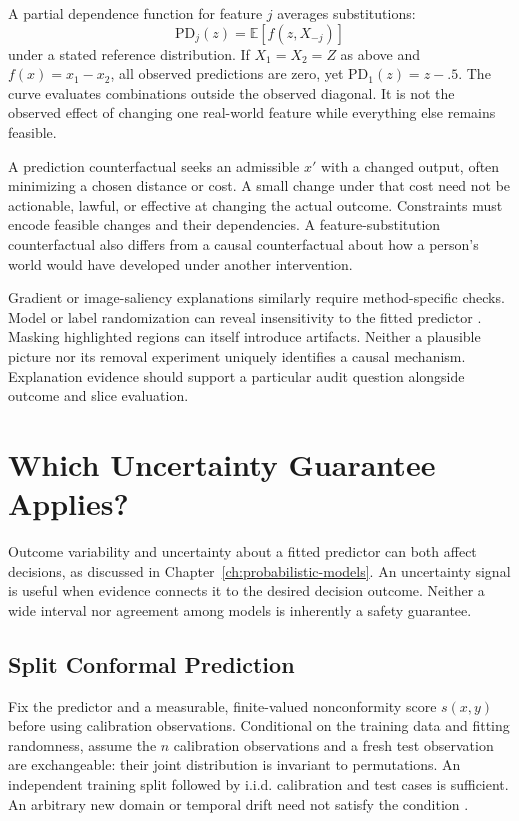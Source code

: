 A partial dependence function for feature $j$ averages substitutions:
\[
\mathrm{PD}_j(z)=\mathbb E[f(z,X_{-j})]
\]
under a stated reference distribution. If $X_1=X_2=Z$ as above and $f(x)=x_1-x_2$, all observed predictions are zero, yet $\mathrm{PD}_1(z)=z-.5$. The curve evaluates combinations outside the observed diagonal. It is not the observed effect of changing one real-world feature while everything else remains feasible.

A prediction counterfactual seeks an admissible $x'$ with a changed output, often minimizing a chosen distance or cost. A small change under that cost need not be actionable, lawful, or effective at changing the actual outcome. Constraints must encode feasible changes and their dependencies. A feature-substitution counterfactual also differs from a causal counterfactual about how a person's world would have developed under another intervention.

Gradient or image-saliency explanations similarly require method-specific checks. Model or label randomization can reveal insensitivity to the fitted predictor \citep{adebayo2018sanity}. Masking highlighted regions can itself introduce artifacts. Neither a plausible picture nor its removal experiment uniquely identifies a causal mechanism. Explanation evidence should support a particular audit question alongside outcome and slice evaluation.

\section{Which Uncertainty Guarantee Applies?}
\label{sec:uq-reliability}

Outcome variability and uncertainty about a fitted predictor can both affect decisions, as discussed in Chapter~\ref{ch:probabilistic-models}. An uncertainty signal is useful when evidence connects it to the desired decision outcome. Neither a wide interval nor agreement among models is inherently a safety guarantee.

\subsection{Split Conformal Prediction}

Fix the predictor and a measurable, finite-valued nonconformity score $s(x,y)$ before using calibration observations. Conditional on the training data and fitting randomness, assume the $n$ calibration observations and a fresh test observation are exchangeable: their joint distribution is invariant to permutations. An independent training split followed by i.i.d. calibration and test cases is sufficient. An arbitrary new domain or temporal drift need not satisfy the condition \citep{shafer2008,angelopoulos2023}.

